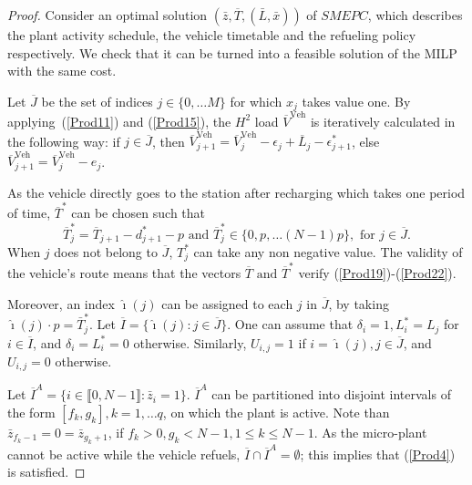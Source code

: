 \documentclass[11pt]{article}
\theoremstyle{plain}%
\theoremstyle{definition} \newtheorem{lem}{Lemma}[section]
\theoremstyle{definition} \newtheorem{claim}{Claim}[lem]
\theoremstyle{definition} \newtheorem{theorem}{Theorem}[section]
\theoremstyle{definition} \newtheorem{exo}{Exercice n$^\circ$}
\theoremstyle{definition} \newtheorem{quest}{}[exo]
\theoremstyle{definition} \newtheorem{sousquest}{}[quest]
\theoremstyle{remark}
\theoremstyle{definition}
\begin{document}
\begin{proof}
Consider an optimal  solution $(\bar{z}, \overline{T}, (\bar{L}, \bar{x}))$ of $SMEPC$,
which describes the plant activity schedule, the vehicle timetable and the refueling policy respectively.
We
check that it can be turned into a feasible solution  of the MILP with the same cost. %

Let $\overline{J}  $ be the set of indices $j \in \{0, \ldots M \}$ for which 
 $x_j $ takes value one. By applying~(\ref{Prod11}) and (\ref{Prod15}), 
the $H^2$ load $\overline{V}^{\textrm{Veh}}$ is iteratively calculated in the following way:
if $ j \in \overline{J}$, then 
$\overline{V}^{\textrm{Veh}}_{j+1} = \overline{V}^{\textrm{Veh}}_{j} - \epsilon_j + \overline{L}_j - \epsilon^*_{j+1}$, else $\overline{V}^{\textrm{Veh}}_{j+1} = \overline{V}^{\textrm{Veh}}_{j} - e_j$.

As the vehicle directly goes to the station after recharging which takes one period of time, 
$ \overline{T}^*$ can be chosen such that
$$ \overline{T}^*_j = \overline{T}_{j+1} - d^*_{j+1} - p \textrm{ and }
 \overline{T}^*_j \in \{0, p, \ldots (N-1)p \}, \textrm{ for } j \in \overline{J}.$$
When $ j$ does not belong to $\overline{J}$, $ T^*_j $ can take any non negative value.
The validity of the vehicle's route means that the vectors $\overline{T} \textrm{ and } \overline{T}^* $ verify
 (\ref{Prod19})-(\ref{Prod22}).

Moreover, an index $\hat{\imath}(j)$ can be assigned to each $j$ in $\overline{J}$,  by taking  $\hat{\imath}(j) \cdot p = \bar{T}^*_j$.
Let $\overline{I} = \{ \hat{\imath}(j): j \in \overline{J} \}$.
One can  assume that
$\delta_i = 1, L^*_i = L_j $ for $i \in \overline{I}$, and $\delta_i =  L^*_i = 0 $ otherwise. 
Similarly, $U_{i,j} = 1 $ if $i =\hat{\imath}(j), j \in \overline{J} $, and $U_{i,j}  = 0 $ otherwise.

Let $\overline{I}^A = \{ i \in \llbracket 0, N-1\rrbracket: \bar{z}_i =1 \} $. $\overline{I}^A$ can be partitioned
into disjoint intervals of the form $[f_k, g_k], k =1, \ldots q  $, on which the plant is active. 
Note than $\bar{z}_{{f_k}-1} = 0 = \bar{z}_{{g_k}+1}$, if  $f_k >0, g_k < N-1, 1 \le k \le N-1 $.
As the micro-plant cannot be active while the vehicle refuels, 
$\overline{I} \cap \overline{I}^A = \emptyset$; this implies that (\ref{Prod4}) is satisfied.


\end{proof}
\end{document}
